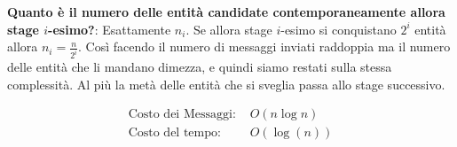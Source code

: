 \textbf{Quanto è il numero delle entità candidate contemporaneamente allora
    stage $i$-esimo?}: Esattamente $n_i$. Se allora stage $i$-esimo si
conquistano $2^i$ entità allora $n_i = \frac{n}{2^i}$. Così facendo il
numero di messaggi inviati raddoppia ma il numero delle entità che li
mandano dimezza, e quindi siamo restati sulla stessa complessità. Al più la
metà delle entità che si sveglia passa allo stage successivo.

\begin{equation*}
    \begin{split}
        \text{Costo dei Messaggi: } & O(n \log n)\\
        \text{Costo del tempo: } & O(\log(n))
    \end{split}
\end{equation*}
